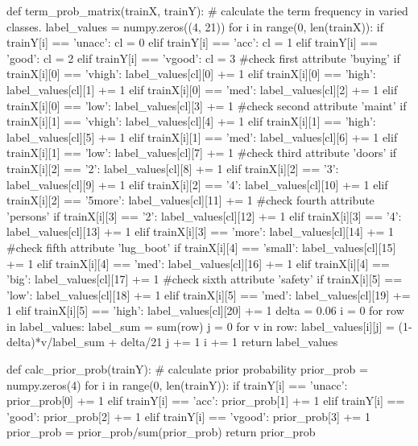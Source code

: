 \begin{mycode}
def term_prob_matrix(trainX, trainY):
	# calculate the term frequency in varied classes.
    label_values = numpy.zeros((4, 21))
    for i in range(0, len(trainX)):
        if trainY[i] == 'unacc':
            cl = 0
        elif trainY[i] == 'acc':
            cl = 1
        elif trainY[i] == 'good':
            cl = 2
        elif trainY[i] == 'vgood':
            cl = 3
        #check first attribute 'buying'
        if trainX[i][0] == 'vhigh':
            label_values[cl][0] += 1
        elif trainX[i][0] == 'high':
            label_values[cl][1] += 1
        elif trainX[i][0] == 'med':
            label_values[cl][2] += 1
        elif trainX[i][0] == 'low':
            label_values[cl][3] += 1
        #check second attribute 'maint'
        if trainX[i][1] == 'vhigh':
            label_values[cl][4] += 1
        elif trainX[i][1] == 'high':
            label_values[cl][5] += 1
        elif trainX[i][1] == 'med':
            label_values[cl][6] += 1
        elif trainX[i][1] == 'low':
            label_values[cl][7] += 1
        #check third attribute 'doors'
        if trainX[i][2] == '2':
            label_values[cl][8] += 1
        elif trainX[i][2] == '3':
            label_values[cl][9] += 1
        elif trainX[i][2] == '4':
            label_values[cl][10] += 1
        elif trainX[i][2] == '5more':
            label_values[cl][11] += 1
        #check fourth attribute 'persons'
        if trainX[i][3] == '2':
            label_values[cl][12] += 1
        elif trainX[i][3] == '4':
            label_values[cl][13] += 1
        elif trainX[i][3] == 'more':
            label_values[cl][14] += 1
        #check fifth attribute 'lug_boot'
        if trainX[i][4] == 'small':
            label_values[cl][15] += 1
        elif trainX[i][4] == 'med':
            label_values[cl][16] += 1
        elif trainX[i][4] == 'big':
            label_values[cl][17] += 1
        #check sixth attribute 'safety'
        if trainX[i][5] == 'low':
            label_values[cl][18] += 1
        elif trainX[i][5] == 'med':
            label_values[cl][19] += 1
        elif trainX[i][5] == 'high':
            label_values[cl][20] += 1
    delta = 0.06
    i = 0
    for row in label_values:
        label_sum = sum(row)
        j = 0
        for v in row:
            label_values[i][j] = (1-delta)*v/label_sum + delta/21
            j += 1
        i += 1
    return label_values	
\end{mycode}

\begin{mycode}
def calc_prior_prob(trainY):
    # calculate prior probability
    prior_prob = numpy.zeros(4)
    for i in range(0, len(trainY)):
        if trainY[i] == 'unacc':
            prior_prob[0] += 1
        elif trainY[i] == 'acc':
            prior_prob[1] += 1
        elif trainY[i] == 'good':
            prior_prob[2] += 1
        elif trainY[i] == 'vgood':
            prior_prob[3] += 1
    prior_prob = prior_prob/sum(prior_prob)
    return prior_prob
\end{mycode}

